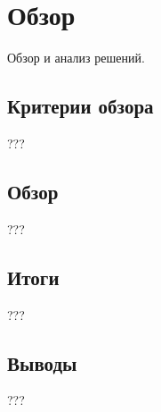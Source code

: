 \chapter{Обзор}

Обзор и анализ решений.

\section{Критерии обзора}

???

\section{Обзор}

???

\section{Итоги}

???

\section{Выводы}

???

